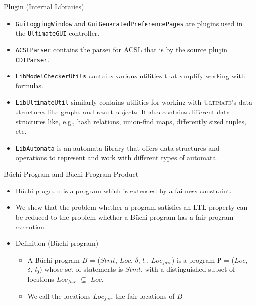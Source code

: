 \documentclass[12pt]{beamer}
\newcommand{\code}[1]{\texttt{#1}}
\newcommand{\ultimates}{\textsc{Ultimate}'s }
\begin{document}
\begin{frame}{Plugin (Internal Libraries)}
	\begin{itemize}
		\item \code{GuiLoggingWindow} and \code{GuiGeneratedPreferencePages} are plugins used in the \code{UltimateGUI} controller.
		\item \code{ACSLParser} contains the parser for ACSL that is by the source plugin \code{CDTParser}.
		\item \code{LibModelCheckerUtils} contains various utilities that simplify working with formulas.
		\item \code{LibUltimateUtil} similarly contains utilities for working with \ultimates data structures like graphs and result objects. It also contains different data structures like, e.g., hash relations, union-find maps, differently sized tuples, etc.
		\item \code{LibAutomata} is an automata library that offers data structures and operations to represent and work with different types of automata.
	\end{itemize}
\end{frame}


\begin{frame}{B\"uchi Program and B\"uchi Program Product}
  	\begin{itemize}
		\item B\"uchi program is a program which is extended by a fairness constraint.
		\item We show that the problem whether a program satisfies an LTL property can be reduced to the problem whether a B\"uchi program has a fair program execution.
		\item Definition (B\"uchi program)
		\begin{itemize}
			\item A B\"uchi program $B$ = ($Stmt$, $Loc$, $\delta$, $l_{0}$, $Loc_{fair}$) is a program P = ($Loc$, $\delta$, $l_{0}$) whose set of statements is $Stmt$, with a distinguished subset of locations $Loc_{fair}$ $\subseteq$ $Loc$.
			\item We call the locations $Loc_{fair}$ the fair locations of $B$.
		\end{itemize}
  	\end{itemize}
\end{frame}
\end{document}
